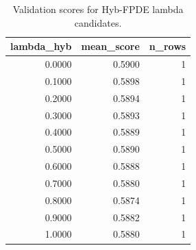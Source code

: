 \begin{table}[t]
\caption{Validation scores for Hyb-FPDE lambda candidates.}
\label{tab:lambda_distribution_computed}
\centering
\begin{tabular}{rrr}
\toprule
lambda\_hyb & mean\_score & n\_rows \\
\midrule
0.0000 & 0.5900 & 1 \\
0.1000 & 0.5898 & 1 \\
0.2000 & 0.5894 & 1 \\
0.3000 & 0.5893 & 1 \\
0.4000 & 0.5889 & 1 \\
0.5000 & 0.5890 & 1 \\
0.6000 & 0.5888 & 1 \\
0.7000 & 0.5880 & 1 \\
0.8000 & 0.5874 & 1 \\
0.9000 & 0.5882 & 1 \\
1.0000 & 0.5880 & 1 \\
\bottomrule
\end{tabular}

\end{table}
